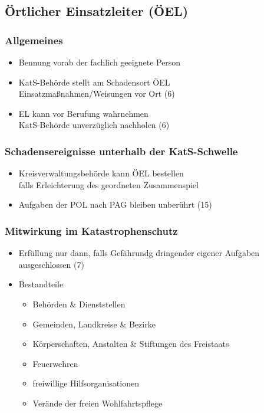 \subsection{Örtlicher Einsatzleiter (ÖEL)}
\begin{normbox}{\subsubsection{Allgemeines}}
    \begin{itemize}
        \item Bennung vorab der fachlich geeignete Person
        \item KatS-Behörde stellt am Schadensort ÖEL\\
        \ra Einsatzmaßnahmen/Weisungen vor Ort (6)
        \item EL kann vor Berufung wahrnehmen\\
        \ra KatS-Behörde unverzüglich nachholen (6)
    \end{itemize}
\end{normbox}
\begin{normbox}{\subsubsection{Schadensereignisse unterhalb der KatS-Schwelle}}
    \begin{itemize}
        \item Kreisverwaltungsbehörde kann ÖEL bestellen\\
        \ra falls Erleichterung des geordneten Zusammenspiel
        \item Aufgaben der POL nach PAG bleiben unberührt (15)
    \end{itemize}
\end{normbox}
\begin{normbox}{\subsubsection{Mitwirkung im Katastrophenschutz}}
    \begin{itemize}
        \item Erfüllung nur dann, falls Gefährundg dringender eigener Aufgaben ausgeschlossen (7)
        \item Bestandteile
        \begin{itemize}
            \item Behörden \& Dienststellen
            \item Gemeinden, Landkreise  \& Bezirke
            \item Körperschaften, Anstalten \& Stiftungen des Freistaats
            \item Feuerwehren
            \item freiwillige Hilfsorganisationen
            \item Verände der freien Wohlfahrtspflege 
        \end{itemize}
    \end{itemize}
\end{normbox}
